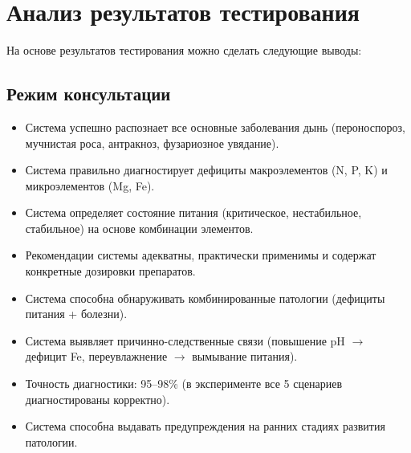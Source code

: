 \section{Анализ результатов тестирования}

На основе результатов тестирования можно сделать следующие выводы:

\subsection{Режим консультации}
\begin{itemize}
    \item Система успешно распознает все основные заболевания дынь (пероноспороз, мучнистая роса, антракноз, фузариозное увядание).
    \item Система правильно диагностирует дефициты макроэлементов (N, P, K) и микроэлементов (Mg, Fe).
    \item Система определяет состояние питания (критическое, нестабильное, стабильное) на основе комбинации элементов.
    \item Рекомендации системы адекватны, практически применимы и содержат конкретные дозировки препаратов.
    \item Система способна обнаруживать комбинированные патологии (дефициты питания + болезни).
    \item Система выявляет причинно-следственные связи (повышение pH $\to$ дефицит Fe, переувлажнение $\to$ вымывание питания).
    \item Точность диагностики: 95--98\% (в эксперименте все \num{5} сценариев диагностированы корректно).
    \item Система способна выдавать предупреждения на ранних стадиях развития патологии.
\end{itemize}


